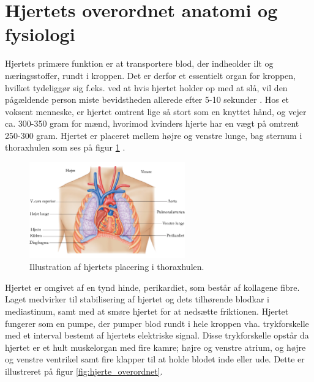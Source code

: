 \section{Hjertets overordnet anatomi og fysiologi}\label{Hjerte_ana_fys}

Hjertets primære funktion er at transportere blod, der indheolder ilt og næringsstoffer, rundt i kroppen. Det er derfor et essentielt organ for kroppen, hvilket tydeliggør sig f.eks. ved at hvis hjertet holder op med at slå, vil den pågældende person miste bevidstheden allerede efter 5-10 sekunder . Hos et voksent menneske, er hjertet omtrent lige så stort som en knyttet hånd, og vejer ca. 300-350 gram for mænd, hvorimod kvinders hjerte har en vægt på omtrent 250-300 gram. Hjertet er placeret mellem højre og venstre lunge, bag sternum i thoraxhulen som ses på figur \ref{fig:hjerte_placering} \cite{gronanatomi}.  

\begin{figure}[H] %
\begin{center}
\includegraphics[width=0.6\textwidth]{figures/thorax.png}
\end{center}
\caption{Illustration af hjertets placering i thoraxhulen. \cite{cindy}}
\label{fig:hjerte_placering}
\end{figure}

\noindent Hjertet er omgivet af en tynd hinde, perikardiet, som består af kollagene fibre. Laget medvirker til stabilisering af hjertet og dets tilhørende blodkar i mediastinum, samt med at smøre hjertet for at nedsætte friktionen. Hjertet fungerer som en pumpe, der pumper blod rundt i hele kroppen vha. trykforskelle med et interval bestemt af hjertets elektriske signal. Disse trykforskelle opstår da hjertet er et hult muskelorgan med fire kamre; højre og venstre atrium, og højre og venstre ventrikel samt fire klapper til at holde blodet inde eller ude. Dette er illustreret på figur \cite{gronanatomi} \ref{fig:hjerte_overordnet}. 

